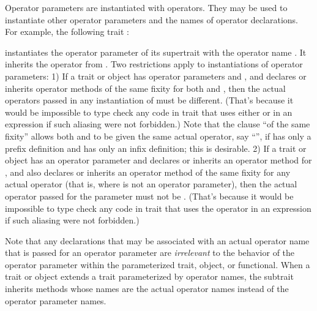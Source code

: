 Operator parameters are instantiated with operators.
They may be used to instantiate other operator parameters
and the names of operator declarations.
For example, the following trait :

instantiates the operator parameter of its supertrait 
with the operator name .  It inherits the 
operator from .
Two restrictions apply to instantiations of operator parameters:
1) If a trait or object  has operator parameters  and
, and  declares or inherits operator methods of the same
fixity for both  and ,
then the actual operators passed in any instantiation of  must
be different.
(That's because it would be impossible to type check any code
in trait  that uses either  or
 in an expression if such
aliasing were not forbidden.)
Note that the clause ``of the same fixity'' allows both  and
 to be given the same actual operator, say ``\EXP{-}'',
if  has only a prefix definition and  has
only an infix definition; this is desirable.
2) If a trait or object  has an operator parameter  and
declares or inherits an operator method for ,
and also declares or inherits an operator method of the same fixity for
any actual operator  (that is, where  is not an operator
parameter), then the actual operator passed for the  parameter
must not be .
(That's because it would be impossible to type check any code
in trait  that uses the operator  in an expression if such
aliasing were not forbidden.)


Note that any declarations that may be associated with an actual operator name
that is passed for an operator parameter are \emph{irrelevant} to the behavior
of the operator parameter within the parameterized trait, object, or functional.
When a trait or object extends a trait parameterized by operator names,
the subtrait inherits methods whose names are the actual operator names instead
of the operator parameter names.


